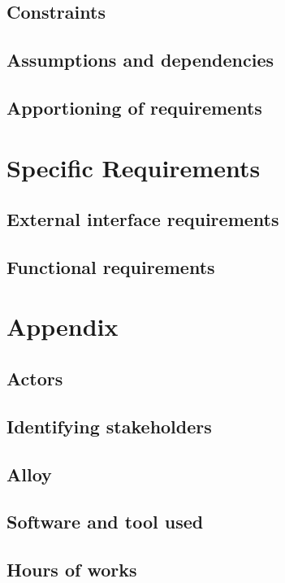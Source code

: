\documentclass[]{report}
\begin{document}
\section{Constraints}


\section{Assumptions and dependencies}


\section{Apportioning of requirements}


\chapter{Specific Requirements}

\section{External interface requirements}


\section{Functional requirements}




\appendix

\chapter{Appendix}

\section{Actors}


\section{Identifying stakeholders}


\section{Alloy}


\section{Software and tool used}


\section{Hours of works}

\end{document}
